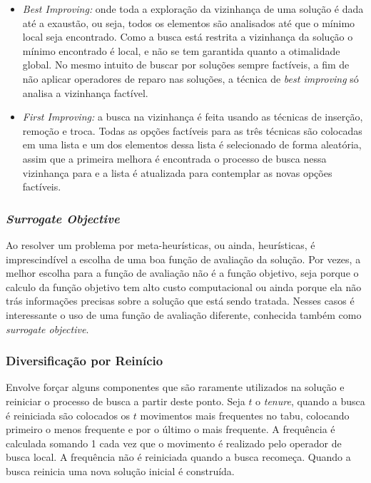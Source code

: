 \documentclass[conference]{IEEEtran}
\begin{document}
        \begin{itemize}

        \item {\it Best Improving:} onde toda a exploração da vizinhança de uma solução é dada até a exaustão, ou seja, todos os elementos são analisados até que o mínimo local seja encontrado. Como
            a busca está restrita a vizinhança da solução o mínimo encontrado é local, e não se tem garantida quanto a otimalidade global. No mesmo intuito de buscar por soluções sempre factíveis, a
                fim de não aplicar operadores de reparo nas soluções, a técnica de {\it best improving} só analisa a vizinhança factível. 

        \item {\it First Improving:} a busca na vizinhança é feita usando as técnicas de inserção, remoção e troca. Todas as opções factíveis para as três técnicas são colocadas em uma lista
        e um dos elementos dessa lista é selecionado de forma aleatória, assim que a primeira melhora é encontrada o processo de busca nessa vizinhança para e a lista é atualizada para
        contemplar as novas opções factíveis. 
        \end{itemize}

    \subsubsection{\it Surrogate Objective} 

        Ao resolver um problema por meta-heurísticas, ou ainda, heurísticas, é imprescindível a escolha de uma boa função de avaliação da solução. Por vezes, a melhor escolha para a função de
        avaliação não é a função objetivo, seja porque o calculo da função objetivo tem alto custo computacional ou ainda porque ela não trás informações precisas sobre a solução que está sendo
        tratada. Nesses casos é interessante o uso de uma função de avaliação diferente, conhecida também como {\it surrogate objective}.



    \subsubsection{Diversificação por Reinício}

        Envolve forçar alguns componentes que são raramente utilizados na solução e reiniciar o processo de busca a partir deste ponto.  Seja $t$ o \textit{tenure}, quando a busca é
        reiniciada são colocados os $t$ movimentos mais frequentes no tabu, colocando primeiro o menos frequente e por o último o mais frequente. A frequência é calculada somando 1 cada vez
        que o movimento é realizado pelo operador de busca local. A frequência não é reiniciada quando a busca recomeça. Quando a busca reinicia uma nova solução inicial é construída.

{}

\end{document}
